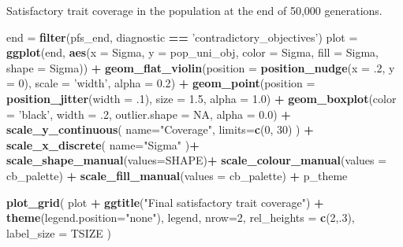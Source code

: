 \documentclass[]{book}
\newenvironment{Shaded}{\begin{snugshade}}{\end{snugshade}}
\newcommand{\DataTypeTok}[1]{\textcolor[rgb]{0.13,0.29,0.53}{#1}}
\newcommand{\DecValTok}[1]{\textcolor[rgb]{0.00,0.00,0.81}{#1}}
\newcommand{\FloatTok}[1]{\textcolor[rgb]{0.00,0.00,0.81}{#1}}
\newcommand{\KeywordTok}[1]{\textcolor[rgb]{0.13,0.29,0.53}{\textbf{#1}}}
\newcommand{\NormalTok}[1]{#1}
\newcommand{\OperatorTok}[1]{\textcolor[rgb]{0.81,0.36,0.00}{\textbf{#1}}}
\newcommand{\OtherTok}[1]{\textcolor[rgb]{0.56,0.35,0.01}{#1}}
\newcommand{\StringTok}[1]{\textcolor[rgb]{0.31,0.60,0.02}{#1}}
\begin{document}
Satisfactory trait coverage in the population at the end of 50,000 generations.

\begin{Shaded}
\begin{Highlighting}[]
\NormalTok{end =}\StringTok{ }\KeywordTok{filter}\NormalTok{(pfs_end, diagnostic }\OperatorTok{==}\StringTok{ 'contradictory_objectives'}\NormalTok{)}
\NormalTok{plot =}\StringTok{ }\KeywordTok{ggplot}\NormalTok{(end, }\KeywordTok{aes}\NormalTok{(}\DataTypeTok{x =}\NormalTok{ Sigma, }\DataTypeTok{y =}\NormalTok{ pop_uni_obj, }\DataTypeTok{color =}\NormalTok{ Sigma, }\DataTypeTok{fill =}\NormalTok{ Sigma, }\DataTypeTok{shape =}\NormalTok{ Sigma)) }\OperatorTok{+}
\StringTok{  }\KeywordTok{geom_flat_violin}\NormalTok{(}\DataTypeTok{position =} \KeywordTok{position_nudge}\NormalTok{(}\DataTypeTok{x =} \FloatTok{.2}\NormalTok{, }\DataTypeTok{y =} \DecValTok{0}\NormalTok{), }\DataTypeTok{scale =} \StringTok{'width'}\NormalTok{, }\DataTypeTok{alpha =} \FloatTok{0.2}\NormalTok{) }\OperatorTok{+}
\StringTok{  }\KeywordTok{geom_point}\NormalTok{(}\DataTypeTok{position =} \KeywordTok{position_jitter}\NormalTok{(}\DataTypeTok{width =} \FloatTok{.1}\NormalTok{), }\DataTypeTok{size =} \FloatTok{1.5}\NormalTok{, }\DataTypeTok{alpha =} \FloatTok{1.0}\NormalTok{) }\OperatorTok{+}
\StringTok{  }\KeywordTok{geom_boxplot}\NormalTok{(}\DataTypeTok{color =} \StringTok{'black'}\NormalTok{, }\DataTypeTok{width =} \FloatTok{.2}\NormalTok{, }\DataTypeTok{outlier.shape =} \OtherTok{NA}\NormalTok{, }\DataTypeTok{alpha =} \FloatTok{0.0}\NormalTok{) }\OperatorTok{+}
\StringTok{  }\KeywordTok{scale_y_continuous}\NormalTok{(}
    \DataTypeTok{name=}\StringTok{"Coverage"}\NormalTok{,}
    \DataTypeTok{limits=}\KeywordTok{c}\NormalTok{(}\DecValTok{0}\NormalTok{, }\DecValTok{30}\NormalTok{)}
\NormalTok{  ) }\OperatorTok{+}
\StringTok{  }\KeywordTok{scale_x_discrete}\NormalTok{(}
    \DataTypeTok{name=}\StringTok{"Sigma"}
\NormalTok{  )}\OperatorTok{+}
\StringTok{  }\KeywordTok{scale_shape_manual}\NormalTok{(}\DataTypeTok{values=}\NormalTok{SHAPE)}\OperatorTok{+}
\StringTok{  }\KeywordTok{scale_colour_manual}\NormalTok{(}\DataTypeTok{values =}\NormalTok{ cb_palette) }\OperatorTok{+}
\StringTok{  }\KeywordTok{scale_fill_manual}\NormalTok{(}\DataTypeTok{values =}\NormalTok{ cb_palette) }\OperatorTok{+}
\StringTok{  }\NormalTok{p_theme}

\KeywordTok{plot_grid}\NormalTok{(}
\NormalTok{  plot }\OperatorTok{+}
\StringTok{    }\KeywordTok{ggtitle}\NormalTok{(}\StringTok{"Final satisfactory trait coverage"}\NormalTok{) }\OperatorTok{+}
\StringTok{    }\KeywordTok{theme}\NormalTok{(}\DataTypeTok{legend.position=}\StringTok{"none"}\NormalTok{),}
\NormalTok{  legend,}
  \DataTypeTok{nrow=}\DecValTok{2}\NormalTok{,}
  \DataTypeTok{rel_heights =} \KeywordTok{c}\NormalTok{(}\DecValTok{2}\NormalTok{,.}\DecValTok{3}\NormalTok{),}
  \DataTypeTok{label_size =}\NormalTok{ TSIZE}
\NormalTok{)}
\end{Highlighting}
\end{Shaded}
\end{document}
